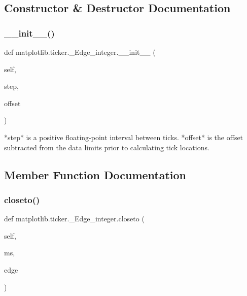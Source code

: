 \subsection{Constructor \& Destructor Documentation}
\mbox{\label{classmatplotlib_1_1ticker_1_1__Edge__integer_af9966ce968933005bf026976818f2e5a}} 
\subsubsection{\texorpdfstring{\+\_\+\+\_\+init\+\_\+\+\_\+()}{\_\_init\_\_()}}
{\footnotesize\ttfamily def matplotlib.\+ticker.\+\_\+\+Edge\+\_\+integer.\+\_\+\+\_\+init\+\_\+\+\_\+ (\begin{DoxyParamCaption}\item[{}]{self,  }\item[{}]{step,  }\item[{}]{offset }\end{DoxyParamCaption})}

\begin{DoxyVerb}*step* is a positive floating-point interval between ticks.
*offset* is the offset subtracted from the data limits
prior to calculating tick locations.
\end{DoxyVerb}
 

\subsection{Member Function Documentation}
\mbox{\label{classmatplotlib_1_1ticker_1_1__Edge__integer_a3d2676482268f53a75ae6773eb0c8d15}} 
\subsubsection{\texorpdfstring{closeto()}{closeto()}}
{\footnotesize\ttfamily def matplotlib.\+ticker.\+\_\+\+Edge\+\_\+integer.\+closeto (\begin{DoxyParamCaption}\item[{}]{self,  }\item[{}]{ms,  }\item[{}]{edge }\end{DoxyParamCaption})}

